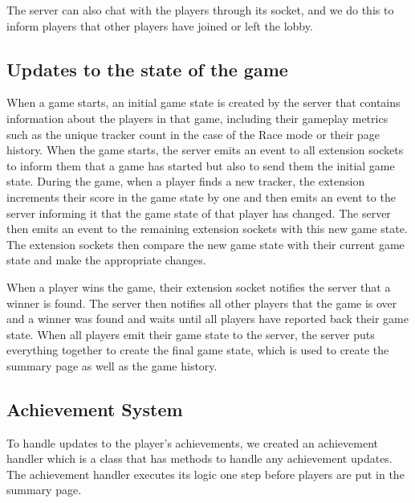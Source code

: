 \documentclass{l4proj}
\begin{document}
The server can also chat with the players through its socket, and we do this to inform players that other players have joined or left the lobby.

\subsection{Updates to the state of the game}
When a game starts, an initial game state is created by the server that contains information about the players in that game, including their gameplay metrics such as the unique tracker count in the case of the Race mode or their page history. When the game starts, the server emits an event to all extension sockets to inform them that a game has started but also to send them the initial game state. During the game, when a player finds a new tracker, the extension increments their score in the game state by one and then emits an event to the server informing it that the game state of that player has changed. The server then emits an event to the remaining extension sockets with this new game state. The extension sockets then compare the new game state with their current game state and make the appropriate changes.

When a player wins the game, their extension socket notifies the server that a winner is found. The server then notifies all other players that the game is over and a winner was found and waits until all players have reported back their game state. When all players emit their game state to the server, the server puts everything together to create the final game state, which is used to create the summary page as well as the game history.

\subsection{Achievement System}
To handle updates to the player's achievements, we created an achievement handler which is a class that has methods to handle any achievement updates. The achievement handler executes its logic one step before players are put in the summary page. 
\end{document}
